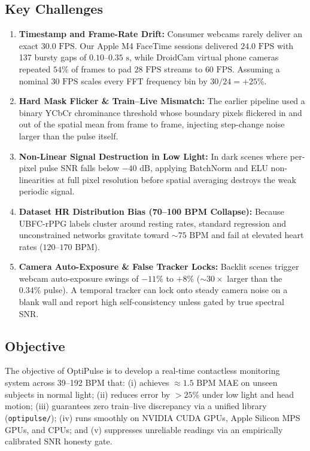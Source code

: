 \documentclass[conference]{IEEEtran}
\begin{document}
\subsection{Key Challenges}
\begin{enumerate}
    \item \textbf{Timestamp and Frame-Rate Drift:} Consumer webcams rarely deliver an exact $30.0\text{ FPS}$. Our Apple M4 FaceTime sessions delivered $24.0\text{ FPS}$ with 137 bursty gaps of $0.10\text{--}0.35\text{ s}$, while DroidCam virtual phone cameras repeated $54\%$ of frames to pad $28\text{ FPS}$ streams to $60\text{ FPS}$. Assuming a nominal $30\text{ FPS}$ scales every FFT frequency bin by $30/24 = +25\%$.
    \item \textbf{Hard Mask Flicker \& Train--Live Mismatch:} The earlier pipeline used a binary YCbCr chrominance threshold whose boundary pixels flickered in and out of the spatial mean from frame to frame, injecting step-change noise larger than the pulse itself.
    \item \textbf{Non-Linear Signal Destruction in Low Light:} In dark scenes where per-pixel pulse SNR falls below $-40\text{ dB}$, applying BatchNorm and ELU non-linearities at full pixel resolution before spatial averaging destroys the weak periodic signal.
    \item \textbf{Dataset HR Distribution Bias (70--100 BPM Collapse):} Because UBFC-rPPG labels cluster around resting rates, standard regression and unconstrained networks gravitate toward $\sim 75\text{ BPM}$ and fail at elevated heart rates ($120\text{--}170\text{ BPM}$).
    \item \textbf{Camera Auto-Exposure \& False Tracker Locks:} Backlit scenes trigger webcam auto-exposure swings of $-11\%$ to $+8\%$ ($\sim 30\times$ larger than the $0.34\%$ pulse). A temporal tracker can lock onto steady camera noise on a blank wall and report high self-consistency unless gated by true spectral SNR.
\end{enumerate}

\subsection{Objective}
The objective of OptiPulse is to develop a real-time contactless monitoring system across 39--192 BPM that: (i) achieves $\approx 1.5\text{ BPM}$ MAE on unseen subjects in normal light; (ii) reduces error by $>25\%$ under low light and head motion; (iii) guarantees zero train--live discrepancy via a unified library (\texttt{optipulse/}); (iv) runs smoothly on NVIDIA CUDA GPUs, Apple Silicon MPS GPUs, and CPUs; and (v) suppresses unreliable readings via an empirically calibrated SNR honesty gate.
\end{document}
